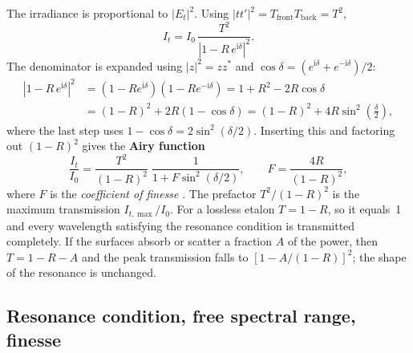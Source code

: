 \documentclass[11pt,a4paper]{article}
\newcommand{\ii}{\mathrm{i}}
\begin{document}
	The irradiance is proportional to $|E_t|^2$. Using $|tt'|^2=T_{\mathrm{front}}T_{\mathrm{back}}=T^2$,
	\begin{equation}
		I_t=I_0\,\frac{T^2}{\left|1-R\,e^{\ii\delta}\right|^2}.
	\end{equation}
	The denominator is expanded using $|z|^2=zz^*$ and $\cos\delta=(e^{\ii\delta}+e^{-\ii\delta})/2$:
	\begin{align}
		\left|1-R\,e^{\ii\delta}\right|^2 &=(1-Re^{\ii\delta})(1-Re^{-\ii\delta})
		=1+R^2-2R\cos\delta \nonumber\\
		&=(1-R)^2+2R(1-\cos\delta)=(1-R)^2+4R\sin^2\!\left(\frac{\delta}{2}\right),
		\label{eq:denom}
	\end{align}
	where the last step uses $1-\cos\delta=2\sin^2(\delta/2)$. Inserting this and factoring out $(1-R)^2$ gives the \textbf{Airy function}
	\begin{equation}
		\frac{I_t}{I_0}=\frac{T^2}{(1-R)^2}\;\frac{1}{1+F\sin^2(\delta/2)},\qquad F=\frac{4R}{(1-R)^2},
		\label{eq:airy}
	\end{equation}
	where $F$ is the \emph{coefficient of finesse} \cite{BornWolf,Hecht,SalehTeich}. The prefactor $T^2/(1-R)^2$ is the maximum transmission $I_{t,\max}/I_0$. For a lossless etalon $T=1-R$, so it equals~1 and every wavelength satisfying the resonance condition is transmitted completely. If the surfaces absorb or scatter a fraction $A$ of the power, then $T=1-R-A$ and the peak transmission falls to $[1-A/(1-R)]^2$; the shape of the resonance is unchanged.
	
	\subsection{Resonance condition, free spectral range, finesse}
	
\end{document}
